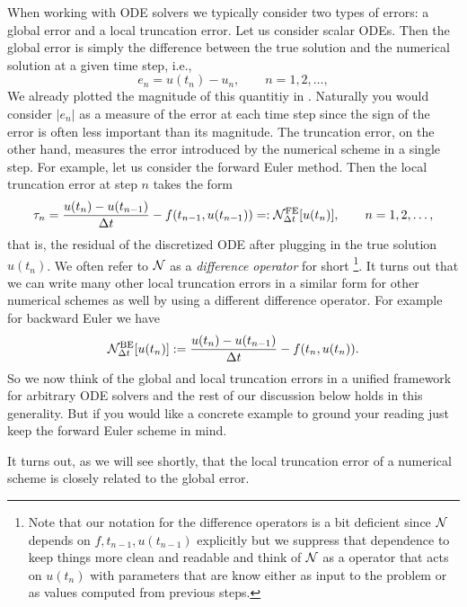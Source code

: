 When working with ODE solvers we typically consider two types of errors: 
a global error and a local truncation error.
Let us consider scalar ODEs. Then the global error is 
simply the difference between the true solution and 
the numerical solution at a given time step, i.e., 
\begin{equation}\label{def:global_error}
    e_n = u(t_n) - u_n, \qquad n = 1, 2, \dots,
\end{equation}
We already plotted the magnitude of this quantitiy in 
.
Naturally you would consider $|e_n|$ as a measure of the error at each time step
since the sign of the error is often less important than its magnitude.
The truncation error, on the other hand, measures the error 
introduced by the numerical scheme in a single step. For example, 
let us consider the forward Euler method. Then the local truncation 
error at step $n$ takes the form 
\begin{equation}\label{def:local_truncation_error}
    \tau_n = \frac{u(t_{n}) - u(t_{n-1})}{\Delta t} - f(t_{n-1},u(t_{n-1})) 
    =: \mathcal{N}^{\text{FE}}_{\Delta t}[u(t_n)], 
    \qquad n =  1, 2, \dots,
\end{equation}
that is, the residual of the discretized ODE  after 
plugging in the true solution $u(t_n)$. We often refer 
to $\mathcal{N}$ as a {\it difference operator} for short
\footnote{Note that our notation for the difference operators 
is a bit deficient since $\mathcal{N}$ depends on $f, t_{n-1}, u(t_{n-1})$
 explicitly but we suppress that dependence to keep things 
 more clean and readable and think of $\mathcal{N}$ as a 
 operator that acts on $u(t_n)$ with parameters that are 
 know either as input to the problem or as values computed 
 from previous steps.}. 
 It turns out that 
we can write many other local truncation errors in a similar form for 
other numerical schemes as well by using a different 
difference operator.  For example for backward Euler 
we have 
\begin{equation*}
    \mathcal{N}^{\text{BE}}_{\Delta t}[u(t_n)] 
    := \frac{u(t_{n}) - u(t_{n-1})}{\Delta t} - f(t_n, u(t_{n})).
\end{equation*}
So we now think of the global and local truncation errors 
in a unified framework for arbitrary ODE solvers and 
the rest of our discussion below holds in this generality. 
But if you would like a concrete example to ground your reading 
just keep the forward Euler scheme in mind. 


It turns out, as 
we will see shortly, that the local truncation error of a numerical 
scheme  is closely related to the global error. 


